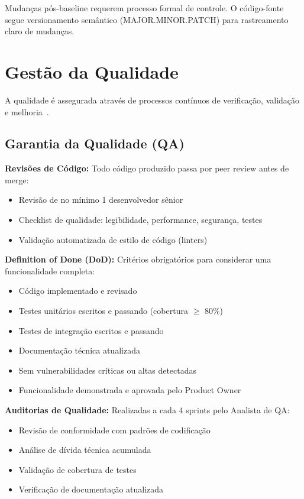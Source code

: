 Mudanças pós-baseline requerem processo formal de controle. O código-fonte segue versionamento semântico (MAJOR.MINOR.PATCH) para rastreamento claro de mudanças.

\section{Gestão da Qualidade}

A qualidade é assegurada através de processos contínuos de verificação, validação e melhoria~\cite{Pressman:2019}.

\subsection{Garantia da Qualidade (QA)}

\textbf{Revisões de Código:} Todo código produzido passa por peer review antes de merge:
\begin{itemize}
    \item Revisão de no mínimo 1 desenvolvedor sênior
    \item Checklist de qualidade: legibilidade, performance, segurança, testes
    \item Validação automatizada de estilo de código (linters)
\end{itemize}

\textbf{Definition of Done (DoD):} Critérios obrigatórios para considerar uma funcionalidade completa:
\begin{itemize}
    \item Código implementado e revisado
    \item Testes unitários escritos e passando (cobertura \(\geq\) 80\%)
    \item Testes de integração escritos e passando
    \item Documentação técnica atualizada
    \item Sem vulnerabilidades críticas ou altas detectadas
    \item Funcionalidade demonstrada e aprovada pelo Product Owner
\end{itemize}

\textbf{Auditorias de Qualidade:} Realizadas a cada 4 sprints pelo Analista de QA:
\begin{itemize}
    \item Revisão de conformidade com padrões de codificação
    \item Análise de dívida técnica acumulada
    \item Validação de cobertura de testes
    \item Verificação de documentação atualizada
\end{itemize}

